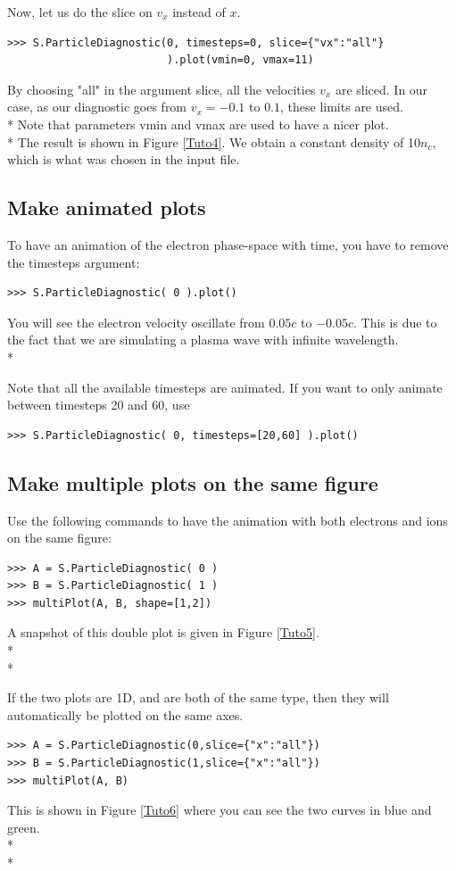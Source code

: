 \documentclass[11pt]{article}
\newcommand{\code}[1]{\colorbox{yellow!15}{\ttfamily #1}}
\begin{document}
Now, let us do the slice on $v_x$ instead of $x$.
\begin{lstlisting}
>>> S.ParticleDiagnostic(0, timesteps=0, slice={"vx":"all"}
                         ).plot(vmin=0, vmax=11)
\end{lstlisting}
By choosing \code{"all"} in the argument \code{slice}, all the velocities $v_x$ are sliced.
In our case, as our diagnostic goes from $v_x=-0.1$ to $0.1$, these limits are used.\\*
Note that parameters \code{vmin} and \code{vmax} are used to have a nicer plot.\\*
The result is shown in Figure \ref{Tuto4}. We obtain a constant density of 10$n_c$, which is what was chosen in the input file.

\subsection{Make animated plots}
To have an animation of the electron phase-space with time, you have to remove the \code{timesteps} argument:
\begin{lstlisting}
>>> S.ParticleDiagnostic( 0 ).plot()
\end{lstlisting}
You will see the electron velocity oscillate from $0.05c$ to $-0.05c$. This is due to the fact that we are simulating a plasma wave with infinite wavelength.\\*

Note that all the available timesteps are animated. If you want to only animate between timesteps 20 and 60, use
\begin{lstlisting}
>>> S.ParticleDiagnostic( 0, timesteps=[20,60] ).plot()
\end{lstlisting}


\subsection{Make multiple plots on the same figure}

Use the following commands to have the animation with both electrons and ions on the same figure:
\begin{lstlisting}
>>> A = S.ParticleDiagnostic( 0 )
>>> B = S.ParticleDiagnostic( 1 )
>>> multiPlot(A, B, shape=[1,2])
\end{lstlisting}
A snapshot of this double plot is given in Figure \ref{Tuto5}.\\*\\*

If the two plots are 1D, and are both of the same type, then they will automatically be plotted on the same axes.
\begin{lstlisting}
>>> A = S.ParticleDiagnostic(0,slice={"x":"all"})
>>> B = S.ParticleDiagnostic(1,slice={"x":"all"})
>>> multiPlot(A, B)
\end{lstlisting}
This is shown in Figure \ref{Tuto6} where you can see the two curves in blue and green.\\*\\*
\end{document}
